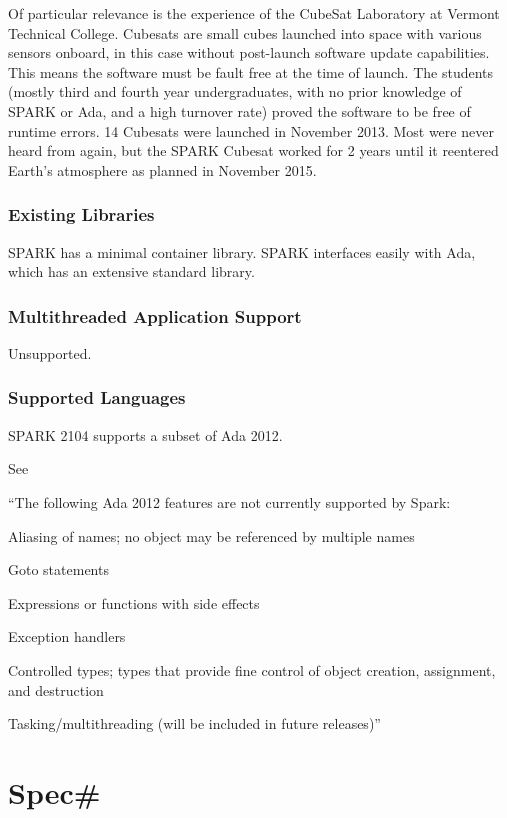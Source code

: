 \documentclass[12pt,openany,a4paper]{book}
\begin{document}
	
	Of particular relevance is the experience of the CubeSat Laboratory at Vermont Technical College\cite{sparkstudents}. Cubesats are small cubes launched into space with various sensors onboard, in this case without post-launch software update capabilities. This means the software must be fault free at the time of launch. The students (mostly third and fourth year undergraduates, with no prior knowledge of SPARK or Ada, and a high turnover rate) proved the software to be free of runtime errors. 14 Cubesats were launched in November 2013. Most were never heard from again, but the SPARK Cubesat worked for 2 years until it reentered Earth's atmosphere as planned in November 2015. 

	\subsubsection{Existing Libraries}
	SPARK has a minimal container library. SPARK interfaces easily with Ada, which has an extensive standard library.

	\subsubsection{Multithreaded Application Support}
	Unsupported.

	\subsubsection{Supported Languages}
	SPARK 2104 supports a subset of Ada 2012.


	See \cite[p.18]{McCormickJohnW.2015Bhia}

	``The following Ada 2012 features are not currently supported by Spark:

	Aliasing of names; no object may be referenced by multiple names

	Goto statements

	Expressions or functions with side effects

	Exception handlers

	Controlled types; types that provide fine control of object creation, assignment, and destruction

	Tasking/multithreading (will be included in future releases)''











\section{Spec\#}
\end{document}
